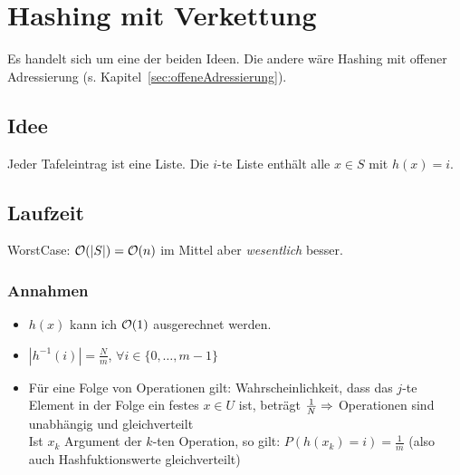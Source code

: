     \section{Hashing mit Verkettung}
        Es handelt sich um eine der beiden Ideen. Die andere wäre Hashing mit offener Adressierung (s. Kapitel~\ref{sec:offeneAdressierung}). 
        
        \subsection{Idee}
        		Jeder Tafeleintrag ist eine Liste. Die $i$-te Liste enthält alle $x\in S$ mit $h(x)=i$.
        
        \subsection{Laufzeit}
        		WorstCase: $\mathcal{O}(|S|)=\mathcal{O}(n)$ im Mittel aber \textit{wesentlich} besser.
        
            \subsubsection{Annahmen}
            		\begin{itemize}
            		\item $h(x)$ kann ich $\mathcal{O}(1)$ ausgerechnet werden.
            		\item $\left|h^{-1}(i)\right|=\frac{N}{m}$,  $\forall i\in \{0,\dots , m-1\}$
            		\item Für eine Folge von Operationen gilt: Wahrscheinlichkeit, dass das $j$-te Element in der Folge ein festes $x\in U$ ist,
            			beträgt $\frac{1}{N}\Ra$ Operationen sind unabhängig und gleichverteilt\\
            			Ist $x_k$ Argument der $k$-ten Operation, so gilt: $P(h(x_k)=i)=\frac{1}{m}$ (also auch Hashfuktionswerte gleichverteilt)
            		\end{itemize}
            
